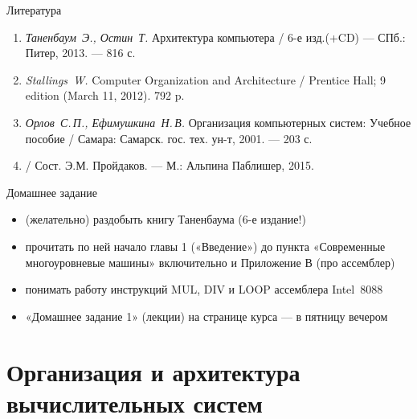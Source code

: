 \begin{frame}{Литература}
\begin{enumerate}
	\item \emph{Таненбаум~Э., Остин~Т.} Архитектура компьютера / 6-е изд.(+CD) — СПб.: Питер, 2013. — 816 с.

	\item \emph{Stallings~W.} Computer Organization and Architecture /  Prentice Hall; 9 edition (March 11, 2012). 792 p.

	\item \emph{Орлов~С.\,П., Ефимушкина~Н.\,В.}
	{Организация компьютерных систем}:
	Учебное пособие / Самара: Самарск. гос. тех. ун-т, 2001. — 203 с.

	\item {} / Сост. Э.М. Пройдаков. — М.:
	Альпина Паблишер, 2015.
\end{enumerate}
\end{frame}

\begin{frame}{Домашнее задание}
\begin{itemize}
	\item (желательно) раздобыть книгу Таненбаума (6-е издание!)
	\item прочитать по ней начало главы 1 («Введение») до пункта «Современные многоуровневые машины» включительно и Приложение В (про ассемблер)
	\item понимать работу инструкций MUL, DIV и LOOP ассемблера Intel~8088
	\item «Домашнее задание 1» (лекции) на странице курса — в пятницу вечером
\end{itemize}
\end{frame}

\section{Организация и архитектура вычислительных систем}

